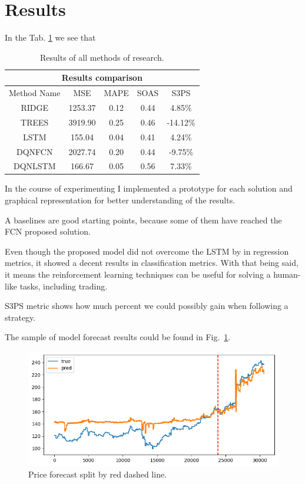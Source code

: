 \documentclass{article}
\begin{document}
\section{Results}
\label{sec:results}

In the Tab. \ref{tab:results} we see that 

\begin{table}[tbh!]
\begin{center}
\begin{tabular}{ |c||c|c|c|c|  }
 \hline
 \multicolumn{5}{|c|}{Results comparison} \\
 \hline
 Method Name & MSE & MAPE & SOAS & S3PS \\
 \hline
 \hline
 RIDGE & 1253.37 & 0.12 & 0.44 & 4.85\% \\
 \hline
 TREES & 3919.90 & 0.25 & 0.46 & -14.12\% \\
 \hline
 LSTM & 155.04 & 0.04 & 0.41 & 4.24\% \\
 \hline
 DQNFCN & 2027.74 & 0.20 & 0.44 & -9.75\% \\
 \hline
 DQNLSTM & 166.67 & 0.05 & 0.56 &  7.33\% \\
 \hline
\end{tabular}
\caption{Results of all methods of research.}
\label{tab:results}
\end{center}
\end{table}

In the course of experimenting I implemented a prototype for each solution and graphical representation for better understanding of the results.

A baselines are good starting points, because some of them have reached the FCN proposed solution.

Even though the proposed model did not overcome the LSTM by \cite{Sen_2021} in regression metrics, it showed a decent results in classification metrics.
With that being said, it means the reinforcement learning techniques can be useful for solving a human-like tasks, including trading.

S3PS metric shows how much percent we could possibly gain when following a strategy. 

The sample of model forecast results could be found in Fig.~\ref{fig:forecasts}.

\begin{figure}[!tbh]
    \centering
    \includegraphics[width=0.9\linewidth]{forecasts.png}
    \caption{Price forecast split by red dashed line.}
    \label{fig:forecasts}
\end{figure}
\end{document}
